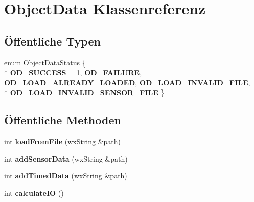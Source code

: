\hypertarget{classObjectData}{\section{Object\-Data Klassenreferenz}
\label{classObjectData}
}
\subsection*{Öffentliche Typen}
\begin{DoxyCompactItemize}
\item 
enum \hyperlink{classObjectData_a20e8cd3cd0f8af3b571b9393aa9e6484}{Object\-Data\-Status} \{ \\*
{\bfseries O\-D\-\_\-\-S\-U\-C\-C\-E\-S\-S} = 1, 
{\bfseries O\-D\-\_\-\-F\-A\-I\-L\-U\-R\-E}, 
{\bfseries O\-D\-\_\-\-L\-O\-A\-D\-\_\-\-A\-L\-R\-E\-A\-D\-Y\-\_\-\-L\-O\-A\-D\-E\-D}, 
{\bfseries O\-D\-\_\-\-L\-O\-A\-D\-\_\-\-I\-N\-V\-A\-L\-I\-D\-\_\-\-F\-I\-L\-E}, 
\\*
{\bfseries O\-D\-\_\-\-L\-O\-A\-D\-\_\-\-I\-N\-V\-A\-L\-I\-D\-\_\-\-S\-E\-N\-S\-O\-R\-\_\-\-F\-I\-L\-E}
 \}
\end{DoxyCompactItemize}
\subsection*{Öffentliche Methoden}
\begin{DoxyCompactItemize}
\item 
\hypertarget{classObjectData_ab2fabb02de2ac4b5ff09b73beb15223d}{int {\bfseries load\-From\-File} (wx\-String \&path)}\label{classObjectData_ab2fabb02de2ac4b5ff09b73beb15223d}

\item 
\hypertarget{classObjectData_a351c17608005c849cb0f26e44beee2ec}{int {\bfseries add\-Sensor\-Data} (wx\-String \&path)}\label{classObjectData_a351c17608005c849cb0f26e44beee2ec}

\item 
\hypertarget{classObjectData_ac8056d23b0882a826b6e572ff080688f}{int {\bfseries add\-Timed\-Data} (wx\-String \&path)}\label{classObjectData_ac8056d23b0882a826b6e572ff080688f}

\item 
\hypertarget{classObjectData_af3a850833d08eb9b45357449f455e24d}{int {\bfseries calculate\-I\-O} ()}\label{classObjectData_af3a850833d08eb9b45357449f455e24d}

\end{DoxyCompactItemize}
